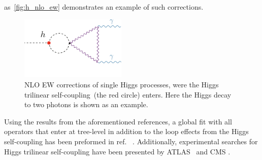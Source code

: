 as~\autoref{fig:h_nlo_ew} demonstrates an example of such corrections.
\begin{figure}[htpb!]
	\begin{center}
		\includegraphics[width=0.45\textwidth]{figures/htoaa_nlo_ew}
		\caption{NLO EW corrections of single Higgs processes,  were the Higgs trilinear self-coupling~(the red circle) enters. Here the Higgs decay to two photons is shown as an example. \label{fig:h_nlo_ew} }
	\end{center}
\end{figure}
Using the results from the aforementioned references, a global fit with all operators that enter at tree-level in addition to the loop effects from the Higgs self-coupling has been preformed in ref.~ \cite{DiVita:2017eyz}. Additionally, experimental searches for Higgs trilinear self-coupling have been presented by ATLAS~\cite{ATLAS:2019pbo} and CMS \cite{CMS:2020gsy}.  
